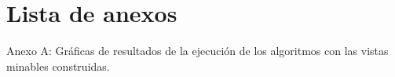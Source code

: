 \chapter*{Lista de anexos}
\normalsize

\noindent Anexo A: Gráficas de resultados de la ejecución de los algoritmos con las vistas minables construidas.\\